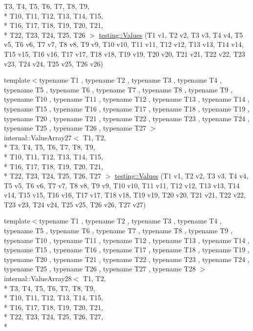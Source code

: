 \begin{DoxyCompactItemize}
T3, T4, T5, T6, T7, T8, T9, \\*
T10, T11, T12, T13, T14, T15, \\*
T16, T17, T18, T19, T20, T21, \\*
T22, T23, T24, T25, T26 $>$ \hyperlink{namespacetesting_aeca27a322529e5bbd6331e40c810a123}{testing\-::\-Values} (T1 v1, T2 v2, T3 v3, T4 v4, T5 v5, T6 v6, T7 v7, T8 v8, T9 v9, T10 v10, T11 v11, T12 v12, T13 v13, T14 v14, T15 v15, T16 v16, T17 v17, T18 v18, T19 v19, T20 v20, T21 v21, T22 v22, T23 v23, T24 v24, T25 v25, T26 v26)
\item 
{\footnotesize template$<$typename T1 , typename T2 , typename T3 , typename T4 , typename T5 , typename T6 , typename T7 , typename T8 , typename T9 , typename T10 , typename T11 , typename T12 , typename T13 , typename T14 , typename T15 , typename T16 , typename T17 , typename T18 , typename T19 , typename T20 , typename T21 , typename T22 , typename T23 , typename T24 , typename T25 , typename T26 , typename T27 $>$ }\\internal\-::\-Value\-Array27$<$ T1, T2, \\*
T3, T4, T5, T6, T7, T8, T9, \\*
T10, T11, T12, T13, T14, T15, \\*
T16, T17, T18, T19, T20, T21, \\*
T22, T23, T24, T25, T26, T27 $>$ \hyperlink{namespacetesting_a089ea706f6cdde715d03ab42aa3099d3}{testing\-::\-Values} (T1 v1, T2 v2, T3 v3, T4 v4, T5 v5, T6 v6, T7 v7, T8 v8, T9 v9, T10 v10, T11 v11, T12 v12, T13 v13, T14 v14, T15 v15, T16 v16, T17 v17, T18 v18, T19 v19, T20 v20, T21 v21, T22 v22, T23 v23, T24 v24, T25 v25, T26 v26, T27 v27)
\item 
{\footnotesize template$<$typename T1 , typename T2 , typename T3 , typename T4 , typename T5 , typename T6 , typename T7 , typename T8 , typename T9 , typename T10 , typename T11 , typename T12 , typename T13 , typename T14 , typename T15 , typename T16 , typename T17 , typename T18 , typename T19 , typename T20 , typename T21 , typename T22 , typename T23 , typename T24 , typename T25 , typename T26 , typename T27 , typename T28 $>$ }\\internal\-::\-Value\-Array28$<$ T1, T2, \\*
T3, T4, T5, T6, T7, T8, T9, \\*
T10, T11, T12, T13, T14, T15, \\*
T16, T17, T18, T19, T20, T21, \\*
T22, T23, T24, T25, T26, T27, \\*

\end{DoxyCompactItemize}
